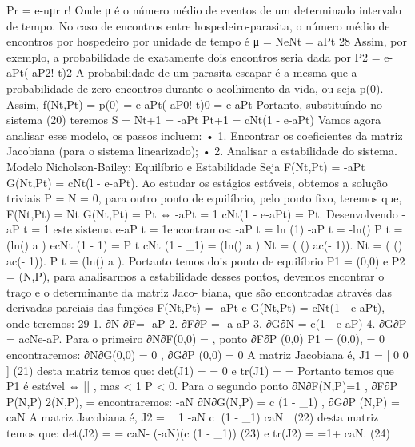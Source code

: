{{{{{{{Pr = e-uμr 
r! Onde μ é o número médio de eventos de um determinado intervalo de tempo. No caso de encontros entre hospedeiro-parasita, o número médio de encontros por hospedeiro por unidade de tempo é 
μ = NeNt = aPt 
28 
Assim, por exemplo, a probabilidade de exatamente dois encontros seria dada por 
P2 = e-aPt(-aP2! 
t)2 
A probabilidade de um parasita escapar é a mesma que a probabilidade de zero encontros durante o acolhimento da vida, ou seja p(0). Assim, 
f(Nt,Pt) = p(0) = e-aPt(-aP0! t)0 
= e-aPt 
Portanto, substituíndo no sistema (20) teremos 
S = 
{ Nt+1 = \lambdaNte-aPt 
Pt+1 = cNt(1 - e-aPt) 
Vamos agora analisar esse modelo, os passos incluem: 
• 1. Encontrar os coeficientes da matriz Jacobiana (para o sistema linearizado); 
• 2. Analisar a estabilidade do sistema. 
Modelo Nicholson-Bailey: Equilíbrio e Estabilidade Seja 
F(Nt,Pt) = \lambdaNte-aPt G(Nt,Pt) = cNt(l - e-aPt). 
Ao estudar os estágios estáveis, obtemos a solução triviais P = N = 0, para outro ponto de equilíbrio, pelo ponto fixo, teremos que, 
{ F(Nt,Pt) = Nt 
G(Nt,Pt) = Pt ⇔ 
{ \lambdae-aPt = 1 
cNt(1 - e-aPt) = Pt. Desenvolvendo \lambdae-aP t = 1 este sistema \Rightarrow  e-aP t = 1\lambda encontramos: \Rightarrow  -aP t = ln 
(1\lambda) 
\Rightarrow  -aP t = -ln(\lambda) \Rightarrow  P t = 
(ln(\lambda) 
a 
) 
ecNt 
(1 - 1) 
\lambda= P t \Rightarrow  cNt 
(1 - \lambda_{1}) 
= 
(ln(\lambda) 
a 
) 
\Rightarrow  Nt = 
( \lambdaln(\lambda) 
ac(\lambda - 1)). 
Nt = 
( \lambdaln(\lambda) 
ac(\lambda - 1)). 
P t = 
(ln(\lambda) 
a 
). 
Portanto temos dois ponto de equilíbrio P1 = (0,0) e P2 = (N,P), para analisarmos a estabilidade desses pontos, devemos encontrar o traço e o determinante da matriz Jaco- biana, que são encontradas através das derivadas parciais das funções F(Nt,Pt) = \lambdaNte-aPt e G(Nt,Pt) = cNt(1 - e-aPt), onde teremos: 
29 
1. ∂N ∂F= \lambdae-aP 
2. ∂F∂P = -a\lambdaNe-aP 
3. ∂G∂N = c(1 - e-aP) 
4. ∂G∂P = acNe-aP. 
Para o primeiro ∂N∂F(0,0) = \lambda , ponto ∂F∂P (0,0) P1 = (0,0), = 0 encontraremos: ∂N∂G(0,0) = 0 , ∂G∂P (0,0) = 0 
A matriz Jacobiana é, 
J1 = 
[  0 0 
] 
(21) 
desta matriz temos que: 
det(J1) =  = 0 e tr(J1) =  = \lambda 
Portanto temos que P1 é estável ⇔ |\lambda| , mas \lambda < 1 \Rightarrow  P < 0. Para o segundo ponto ∂N∂F(N,P)=1 , ∂F∂P P(N,P) 2(N,P), = encontraremos: -aN ∂N∂G(N,P) = c 
(1 - \lambda_{1}) 
, ∂G∂P (N,P) = caN\lambda 
A matriz Jacobiana é, 
J2 = 
 1 -aN 
c 
(1 - \lambda_{1}) caN\lambda 
 (22) 
desta matriz temos que: 
det(J2) =  = caN\lambda - (-aN)(c 
(1 - \lambda_{1})) 
(23) 
e 
tr(J2) =  =1+ caN\lambda . (24) 
}}}}}}}}}}
